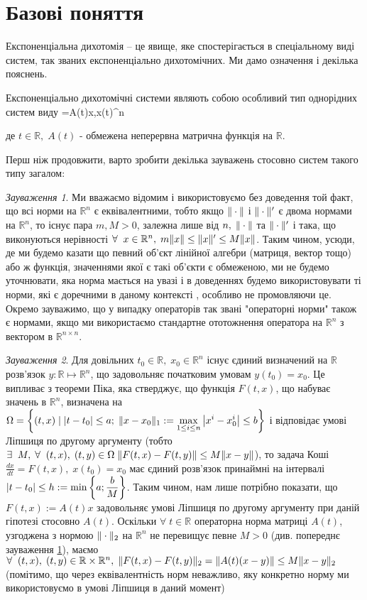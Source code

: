 \documentclass[14pt]{extarticle} %
\let\oldforall\forall
\renewcommand{\forall}{\oldforall\;}
\let\oldexists\exists
\renewcommand{\exists}{\oldexists\;}
\theoremstyle{remark}
\newtheorem{remark}{Зауваження}
\begin{document}
\section{Базові поняття}
Експоненціальна дихотомія -- це явище, яке спостерігається в спеціальному виді систем, так званих експоненціально дихотомічних.
Ми дамо означення і декілька пояснень.

Експоненціально дихотомічні системи являють собою особливий тип однорідних систем виду
\equation\label{LinHomSysDef}=A(t)x,\;x(t)\in{}^n\endequation

де $t\in\mathbb{R},\; A(t)$ - обмежена неперервна матрична функція на $\mathbb{R}$. 

Перш ніж продовжити, варто зробити декілька зауважень стосовно систем такого типу загалом:
\begin{remark}\label{AllNormsAreEqRemark}
	Ми вважаємо відомим і використовуємо без доведення той факт, що всі норми на $\mathbb{R}^n$ є еквівалентними,
	тобто якщо $\|\cdot\|$ і $\|\cdot\|'$ є двома нормами на $\mathbb{R}^n$, то існує пара $m,M>0$, залежна
	лише від $n,\;\|\cdot\|$ та $\|\cdot\|'$ і така, що виконуються нерівності $\forall x\in\mathbb{R}^n,\;m\mynorm{x}\leq
	\mynorm{x}'\leq M\mynorm{x}$. Таким чином, усюди, де ми будемо казати що певний об’єкт лінійної алгебри (матриця, вектор тощо) або ж
	функція, значеннями якої є такі об’єкти є обмеженою, ми не будемо уточнювати, яка норма мається на увазі і в доведеннях будемо 
	використовувати ті норми, які є доречними в даному контексті
	, особливо не промовляючи це. Окремо зауважимо, що у випадку операторів так звані "операторні норми" також
	є нормами, якщо ми використаємо стандартне ототожнення оператора на $\mathbb{R}^n$ з вектором в $\mathbb{R}^{n\times n}$.
\end{remark}
\begin{remark}\label{SolsExistAndUniqRemark}
	Для довільних $t_0\in\mathbb{R},\;x_0\in\mathbb{R}^n$ існує єдиний визначений на 
$\mathbb{R}$ розв'язок $y:\mathbb{R}\mapsto\mathbb{R}^n$, що задовольняє початковим умовам $y(t_0)=x_0$.
Це випливає з теореми Піка, яка стверджує, що функція $F(t,x)$, що набуває значень в $\mathbb{R}^n$, визначена на 
$\Omega=\left\{(t,x) \mid \myabs{t-t_0}\leq a;\;\mynorm{x-x_0}_1:=\max_{1\leq i\leq n}\myabs{x^i-x^i_0}\leq b\right\}$ і відповідає умові Ліпшиця по другому аргументу (тобто 
$\exists M,\;\forall (t,x),\;(t,y)\in\Omega\;\mynorm{F(t,x)-F(t,y)}\leq M\mynorm{x-y}$), то задача Коші $\frac{dx}{dt}=F(t,x),\;x(t_0)=x_0$
має єдиний розв’язок принаймні на інтервалі $\myabs{t-t_0}\leq h:=\min\left\{a;\frac{b}{M}\right\}$. Таким чином, нам лише потрібно показати,
що $F(t,x):=A(t)x$ задовольняє умові Ліпшиця по другому аргументу при даній гіпотезі стосовно $A(t)$. Оскільки $\forall t\in\mathbb{R}$
операторна норма матриці $A(t)$, узгоджена з нормою $\|\cdot\|_2$ на $\mathbb{R}^n$ не перевищує певне $M>0$
(див. попереднє зауваження \ref{AllNormsAreEqRemark}), маємо 
$\forall (t,x),\;(t,y)\in\mathbb{R}\times\mathbb{R}^n,\;\mynorm{F(t,x)-F(t,y)}_2=\mynorm{A(t)(x-y)}\leq M\mynorm{x-y}_2$ (помітимо,
що через еквівалентність норм неважливо, яку конкретно норму ми використовуємо в умові Ліпшиця в даний момент)
\end{remark}
\end{document}
